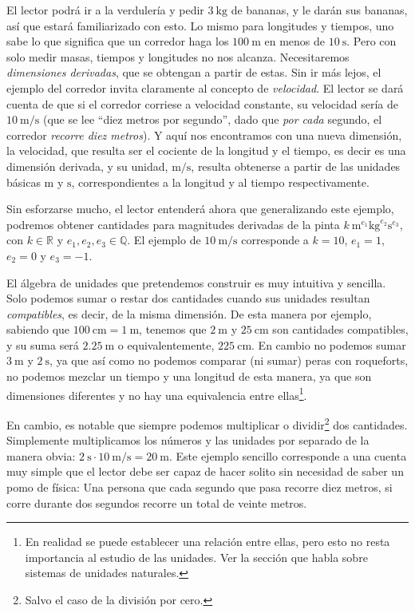 \documentclass{article}
\begin{document}
El lector podrá ir a la verdulería y pedir $\SI{3}{\kilogram}$ de bananas, y le darán sus bananas, así que estará familiarizado con esto.
Lo mismo para longitudes y tiempos, uno sabe lo que significa que un corredor haga los $\SI{100}{\meter}$ en menos de $\SI{10}{\second}$.
Pero con solo medir masas, tiempos y longitudes no nos alcanza. Necesitaremos \textit{dimensiones derivadas}, que se obtengan a
partir de estas. Sin ir más lejos, el ejemplo del corredor invita claramente al concepto de \textit{velocidad}. El lector se dará cuenta de
que si el corredor corriese a velocidad constante, su velocidad sería de $\SI{10}{\meter\per\second}$ (que se lee ``diez metros por segundo'', dado que
\textit{por cada} segundo, el corredor \textit{recorre diez metros}). Y aquí nos encontramos
con una nueva dimensión, la velocidad, que resulta ser el cociente de la longitud y el tiempo, es decir es una dimensión derivada,
y su unidad, $\si{\meter \per \second}$, resulta obtenerse a partir de las unidades básicas $\si{\meter}$ y $\si{\second}$,
correspondientes a la longitud y al tiempo respectivamente.

Sin esforzarse mucho, el lector entenderá ahora que generalizando este ejemplo, podremos obtener cantidades para magnitudes derivadas de la pinta
$k \ \si{\meter}^{e_1}\si{\kilogram}^{e_2}\si{\second}^{e_3}$, con $k \in \mathbb{R}$ y $e_1,e_2,e_3 \in \mathbb{Q}$. El
ejemplo de $\SI{10}{\meter\per\second}$ corresponde a $k=10$, $e_1=1$, $e_2=0$ y $e_3=-1$.

El álgebra de unidades que pretendemos construir es muy intuitiva y sencilla. Solo podemos sumar o restar dos cantidades cuando sus
unidades resultan \textit{compatibles}, es decir, de la misma dimensión. De esta manera por ejemplo, sabiendo que
$\SI{100}{\centi \meter} = \SI{1}{\meter}$, tenemos que $\SI{2}{\meter}$ y $\SI{25}{\centi \meter}$ son cantidades compatibles, y su suma
será $\SI{2,25}{\meter}$ o equivalentemente, $\SI{225}{\centi \meter}$. En cambio no podemos sumar $\SI{3}{\meter}$ y $\SI{2}{\second}$,
ya que así como no podemos comparar (ni sumar) peras con roqueforts, no podemos mezclar un tiempo y una longitud de esta manera, ya
que son dimensiones diferentes y no hay una equivalencia entre ellas\footnote{En realidad se puede establecer una relación entre ellas,
pero esto no resta importancia al estudio de las unidades. Ver la sección que habla sobre sistemas de unidades naturales.}.

En cambio, es notable que siempre podemos multiplicar o dividir\footnote{Salvo el caso de la división por cero.} dos cantidades.
Simplemente multiplicamos los números y las unidades por separado de la manera obvia: 
$\SI{2}{\second} \cdot \SI{10}{\meter\per\second} = \SI{20}{\meter}$. Este ejemplo sencillo corresponde a una cuenta muy simple
que el lector debe ser capaz de hacer solito sin necesidad de saber un pomo de física: Una persona que cada segundo que pasa
recorre diez metros, si corre durante dos segundos recorre un total de veinte metros.
\end{document}
